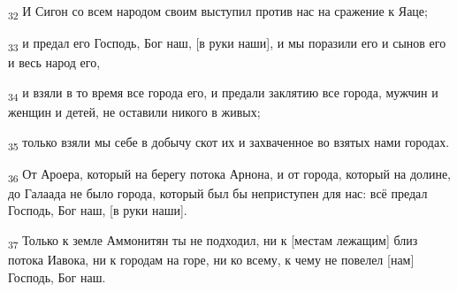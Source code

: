 \begin{tcolorbox}
\textsubscript{32} И Сигон со всем народом своим выступил против нас на сражение к Яаце;
\end{tcolorbox}
\begin{tcolorbox}
\textsubscript{33} и предал его Господь, Бог наш, [в руки наши], и мы поразили его и сынов его и весь народ его,
\end{tcolorbox}
\begin{tcolorbox}
\textsubscript{34} и взяли в то время все города его, и предали заклятию все города, мужчин и женщин и детей, не оставили никого в живых;
\end{tcolorbox}
\begin{tcolorbox}
\textsubscript{35} только взяли мы себе в добычу скот их и захваченное во взятых нами городах.
\end{tcolorbox}
\begin{tcolorbox}
\textsubscript{36} От Ароера, который на берегу потока Арнона, и от города, который на долине, до Галаада не было города, который был бы неприступен для нас: всё предал Господь, Бог наш, [в руки наши].
\end{tcolorbox}
\begin{tcolorbox}
\textsubscript{37} Только к земле Аммонитян ты не подходил, ни к [местам лежащим] близ потока Иавока, ни к городам на горе, ни ко всему, к чему не повелел [нам] Господь, Бог наш.
\end{tcolorbox}
